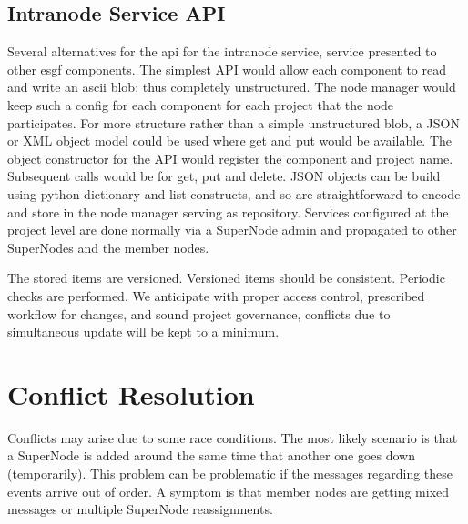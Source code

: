 \documentclass[oneside,12pt]{memoir}
\begin{document}
\subsection{Intranode Service API}

Several alternatives for the api for the intranode service, service presented to other esgf components.   The simplest API would allow each component to read and write an ascii blob; thus completely unstructured.  The node manager would keep such a config for each component for each project that the node participates.  For more structure rather than a simple unstructured blob, a JSON or XML object model could be used where get and put would be available.   The object constructor for the API would register the component and project name.  Subsequent calls would be for get, put and delete.  JSON objects can be build using python dictionary and list constructs, and so are straightforward to encode and store in the node manager serving as repository.   Services configured at the project level are done normally via a SuperNode admin and propagated to other SuperNodes and the member nodes.

The stored items are versioned.  Versioned items should be consistent.  Periodic checks are performed.  We anticipate with proper access control, prescribed workflow for changes, and sound project governance, conflicts due to simultaneous update will be kept to a minimum.

\section{Conflict Resolution}

Conflicts may arise due to some race conditions.  The most likely scenario is that a SuperNode is added around the same time that another one goes down (temporarily).    This problem can be problematic if the messages regarding these events arrive out of order.  A symptom is that member nodes are getting mixed messages or multiple SuperNode reassignments.
\end{document}
